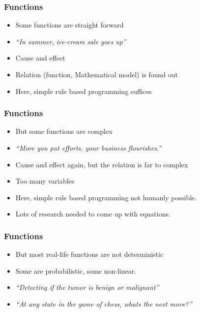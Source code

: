 \begin{frame}[fragile]\frametitle{Functions}
\begin{itemize}
\item Some functions are straight forward
\item {\em ``In summer, ice-cream sale goes up''}
\item Cause and effect
\item Relation (function, Mathematical model) is found out
\item Here, simple rule based programming suffices
\end{itemize}
\end{frame}

\begin{frame}[fragile]\frametitle{Functions}
\begin{itemize}
\item But some functions are complex
\item {\em ``More you put efforts, your business flourishes.''}
\item Cause and effect again, but the relation is far to complex
\item Too many variables
\item Here, simple rule based programming not humanly possible.
\item Lots of research needed to come up with equations.
\end{itemize}
\end{frame}




\begin{frame}[fragile]\frametitle{Functions}
\begin{itemize}
\item But most real-life functions are not deterministic
\item Some are probabilistic, some non-linear.
\item {\em ``Detecting if the tumor is benign or malignant''}
\item {\em ``At any state in the game of chess, whats the next move?''}
\end{itemize}
\end{frame}

